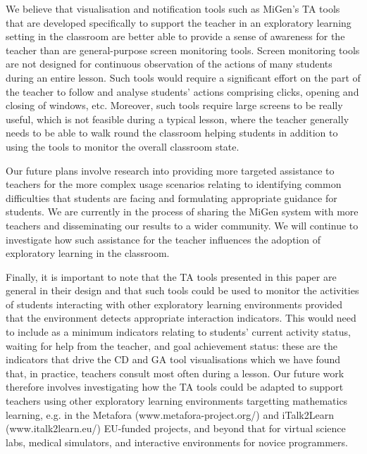 We believe that visualisation and notification tools such as MiGen's TA tools 
that are developed specifically to support the teacher in an exploratory learning setting 
in the classroom are better able to provide a sense of awareness for the teacher 
than are general-purpose screen monitoring tools.
Screen monitoring tools are not designed for continuous observation 
of the actions of many students during an entire lesson. 
Such tools would require a significant effort
on the part of the teacher to follow and analyse students' actions
comprising clicks, opening and closing of windows, etc. Moreover, such
tools require large screens to be really useful, which is not feasible
during a typical lesson, where the teacher generally needs to be able
to walk round the classroom helping students in addition to using the
tools to monitor the overall classroom state. 

Our future plans involve research into providing more targeted 
assistance to teachers for the more complex usage scenarios relating to
identifying common difficulties that students are facing and
formulating appropriate guidance for students. We are currently in the
process of sharing the MiGen system with more teachers and
disseminating our results to a wider community. We will continue 
to investigate how such assistance for the teacher
influences the adoption of exploratory learning in the classroom. 

Finally, it is important to note that the TA tools presented in this
paper are general in their design and that such tools could be used to
monitor the activities of students interacting with other exploratory
learning environments provided that the environment 
detects appropriate interaction indicators.
This would need to include as a minimum indicators relating to 
students' current activity status, 
waiting for help from the teacher, and goal
achievement status: 
these are the indicators that drive the CD and GA tool visualisations 
which we have found that, in practice, teachers consult most often during a lesson. 
Our future work therefore involves investigating how the TA tools
could be adapted to support teachers using other exploratory learning
environments targetting mathematics learning, e.g. in the Metafora (www.metafora-project.org/) 
and iTalk2Learn (www.italk2learn.eu/) EU-funded projects, 
and beyond that for virtual science labs, medical simulators, 
and interactive environments for novice programmers.



